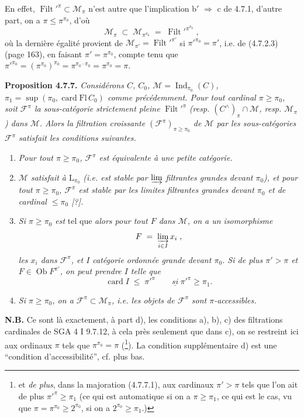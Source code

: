 \documentclass[11pt]{article}
\newcommand{\printedpage}[1]{\marginpar{\footnotesize p.~#1}}
\newcommand{\msp}[1]{\marginpar{\footnotesize [#1]}}
\newcommand{\Filt}{\operatorname{Filt}}
\newcommand{\card}{\operatorname{card}}
\newcommand{\Ob}{\operatorname{Ob}}
\newcommand{\Ind}{\operatorname{Ind}}
\begin{document}
En effet, $\Filt'^{\pi} \subset \mathcal{M}_{\pi}$ n’est autre que l’implication b$'$ $\Longrightarrow$ c de 4.7.1, d’autre part, on a $\pi \leqslant \pi^{\pi_0}$, d’où
\[
\mathcal{M}_{\pi} \;\subset\; \mathcal{M}_{\pi^{\pi_0}} \;=\; \Filt'^{\pi^{\pi_0}} \;,
\]
où la dernière égalité provient de $\mathcal{M}_{\pi'} = \Filt'^{\pi'}$ si $\pi'^{\pi_0} = \pi'$, i.e. de (4.7.2.3) (page 163), en faisant $\pi' = \pi^{\pi_0}$, compte tenu que $\pi'^{\pi_0} = (\pi^{\pi_0})^{\pi_0} = \pi^{\pi_0 \cdot \pi_0} = \pi^{\pi_0} = \pi$.

\msp{page 172}
\textbf{Proposition 4.7.7.} \textit{Considérons $C$, $C_0$, $\mathcal{M} = \Ind_{\pi_0}(C)$, $\pi_1 = \sup(\pi_0, \card \mathrm{Fl}\, C_0)$ comme précédemment. Pour tout cardinal $\pi \geqslant \pi_0$, soit $\mathcal{F}^{\pi}$ la sous-catégorie strictement pleine} $\Filt'^{\pi}$ \textit{(resp. $(C^{\wedge})_{\pi} \cap \mathcal{M}$, resp. $\mathcal{M}_{\pi}$) dans $\mathcal{M}$. Alors la filtration croissante $(\mathcal{F}^{\pi})_{\pi \geqslant \pi_0}$ de $\mathcal{M}$ par les sous-catégories $\mathcal{F}^{\pi}$ satisfait les conditions suivantes.}
\begin{enumerate}
\item[\textit{a)}] \textit{Pour tout $\pi \geqslant \pi_0$, $\mathcal{F}^{\pi}$ est équivalente à une petite catégorie.}
\item[\textit{b)}] \textit{$\mathcal{M}$ satisfait à $\mathrm{L}_{\pi_0}$ (i.e. est stable par $\varinjlim$ filtrantes grandes devant $\pi_0$), et pour tout $\pi \geqslant \pi_0$, $\mathcal{F}^{\pi}$ est stable par les limites filtrantes grandes devant $\pi_0$ et de cardinal $\leqslant \pi_0$ [?].}
\printedpage{58}
\item[\textit{c)}] \textit{Si $\pi \geqslant \pi_0$ est} tel que  \textit{alors pour tout $F$ dans $\mathcal{M}$, on a un isomorphisme}
\[
F \;=\; \varinjlim_{i \in I} x_i \;,
\]
\textit{les $x_i$ dans $\mathcal{F}^{\pi}$, et $I$ catégorie ordonnée grande devant $\pi_0$. Si de plus $\pi' > \pi$ et $F \in \Ob F^{\pi'}$, on peut prendre $I$ telle que} %
\[
\card I \;\leqslant\; \pi'^{\pi} \qquad \underline{\textit{si}}\ \pi'^{\pi} \geqslant \pi_1. \tag*{(4.7.7.1)}
\]
\item[\textit{d)}] \textit{Si $\pi \geqslant \pi_0$, on a $\mathcal{F}^{\pi} \subset \mathcal{M}_{\pi}$, i.e. les objets de $\mathcal{F}^{\pi}$ sont $\pi$-accessibles.}
\end{enumerate}
\textbf{N.B.} Ce sont là exactement, à part d), les conditions a), b), c) des filtrations cardinales de SGA 4 I 9.7.12, \msp{page 173} à cela près seulement que dans c), on se restreint ici aux ordinaux $\pi$ tels que $\pi^{\pi_0} = \pi$ (\footnote[72]{et \textit{de plus}, dans la majoration (4.7.7.1), aux cardinaux $\pi' > \pi$ tels que l’on ait de plus $\pi'^{\pi} \geqslant \pi_1$ (ce qui est automatique si on a $\pi \geqslant \pi_1$, ce qui est le cas, vu que $\pi = \pi^{\pi_0} \geqslant 2^{\pi_0}$, si on a $2^{\pi_0} \geqslant \pi_1$.)}). La condition supplémentaire d) est une “condition d’accessibilité”, cf. plus bas.
\end{document}
